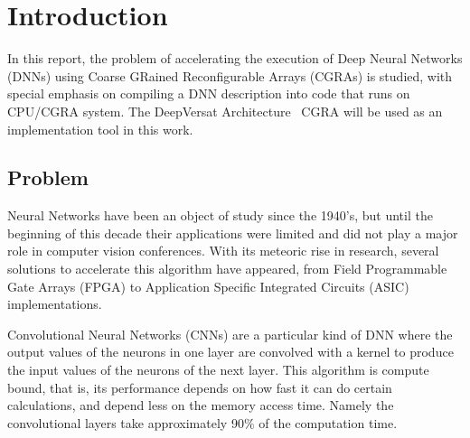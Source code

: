 
\chapter{Introduction}
\label{chapter:introduction}




In this report, the problem of accelerating the execution of Deep Neural
Networks (DNNs) using Coarse GRained Reconfigurable Arrays (CGRAs) is studied,
with special emphasis on compiling a DNN description into code that runs on
CPU/CGRA system. The DeepVersat Architecture~\cite{valter:deepversat} CGRA will be used as an
implementation tool in this work.


\section{Problem}
\label{section:problem}

Neural Networks have been an object of study since the 1940's, but until the
beginning of this decade their applications were limited and did not play a
major role in computer vision conferences. With its meteoric rise in research,
several solutions to accelerate this algorithm have appeared, from Field Programmable Gate Arrays (FPGA) to
Application Specific Integrated Circuits (ASIC) implementations.

Convolutional Neural Networks (CNNs) are a particular kind of DNN where the output
values of the neurons in one layer are convolved with a kernel to produce the
input values of the neurons of the next layer. This algorithm is compute bound,
that is, its performance depends on how fast it can do certain calculations, and
depend less on the memory access time. Namely the convolutional layers take
approximately 90$\%$ of the computation time.


